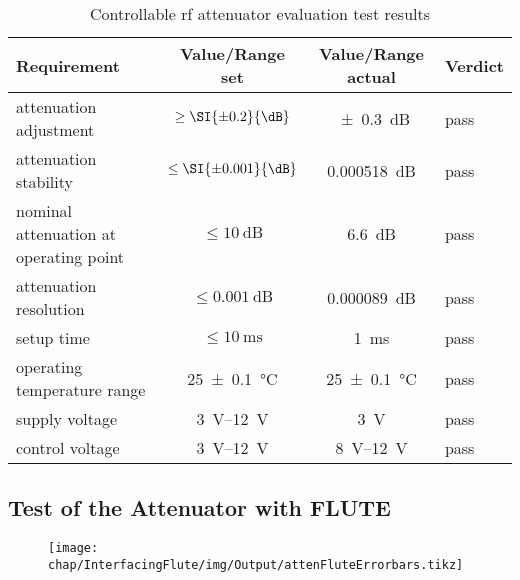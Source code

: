 \begin{table}[tbh]
\caption{Controllable \gls{rf} attenuator evaluation test results}
\label{tab:interfacingFlute_rfattenrequirements_result}
\centering
\begin{tabular}{lccl}
	\toprule
	Requirement                            &      {Value/Range} set      &  {Value/Range} actual   & Verdict \\ \midrule
	attenuation adjustment                 &    $\ge\SI{\pm0.2}{\dB}$    &    \SI{\pm0.3}{\dB}     & pass    \\
	attenuation stability                  &   $\le\SI{\pm0.001}{\dB}$   &   \SI{0.000518}{\dB}    & pass    \\
	nominal attenuation at operating point &      $\le\SI{10}{\dB}$      &      \SI{6.6}{\dB}      & pass    \\
	attenuation resolution                 &    $\le\SI{0.001}{\dB}$     &   \SI{0.000089}{\dB}    & pass    \\
	setup time                             & $\le\SI{10}{\milli\second}$ &       \SI{1}{\ms}       & pass    \\
	operating temperature range            &   \SI{25\pm0.1}{\celsius}   & \SI{25\pm0.1}{\celsius} & pass    \\
	supply voltage                         &   \SIrange{3}{12}{\volt}    &      \SI{3}{\volt}      & pass    \\
	control voltage                        &   \SIrange{3}{12}{\volt}    & \SIrange{8}{12}{\volt}  & pass    \\ \bottomrule
\end{tabular}
\end{table}

\subsection{Test of the Attenuator with FLUTE}

\begin{figure}[tb]
	\centering
	\texttt{[image: chap/InterfacingFlute/img/Output/attenFluteErrorbars.tikz]}
	\caption{}
	\label{fig:aaaa}
\end{figure}



